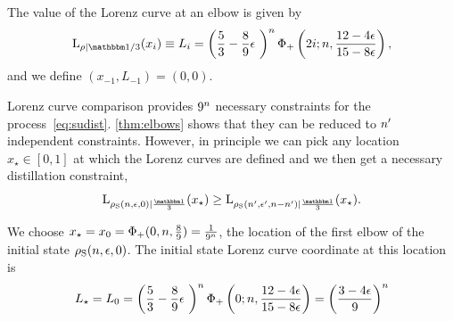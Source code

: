 \documentclass[pra,
aps,
twocolumn,
superscriptaddress,
groupedaddress,
nofootinbib,
reprint
]{revtex4-1}
\begin{document}
The value of the Lorenz curve at an elbow is given by
\begin{equation}
	\lc{\rho}{\id/3}(x_{\ii}) \equiv L_{\ii} =  \left( \frac{5}{3} - \frac{8}{9}\epsilon\ \right)^{\nn} \Phi_+\left(2i;\nn,\frac{12-4\epsilon}{15-8\epsilon}\right),
\end{equation}
and we define $(x_{-1}, L_{-1}) = (0,0)$.

Lorenz curve comparison provides $9^\nn$ necessary constraints for the process~\cref{eq:sudist}.
\cref{thm:elbows} shows that they can be reduced to $\tt$ independent constraints.
However, in principle we can pick any location $x_\star \in [0,1]$ at which the Lorenz curves are defined and we then get a necessary distillation constraint, 
\begin{equation}
	\lc{\noisys(\nn, \epsilon, 0)}{\frac{\id}{3}}(x_\star) \geq \lc{\noisys(\tt, \epsilon', \nn-\tt)}{\frac{\id}{3}}(x_\star).
\end{equation}

We choose $x_\star = x_0 = \Phi_+(0, \nn, \frac{8}{9}) = \frac{1}{9^{\nn}}$, the location of the first elbow of the initial state $\noisys(\nn, \epsilon, 0)$.
The initial state Lorenz curve coordinate at this location is
\begin{equation}
	L_\star = L_0 = \left( \frac{5}{3} - \frac{8}{9}\epsilon\ \right)^{\nn} \Phi_+\left(0;\nn,\frac{12-4\epsilon}{15-8\epsilon}\right) = \left(\frac{3-4\epsilon}{9}\right)^\nn
\end{equation}
\end{document}
